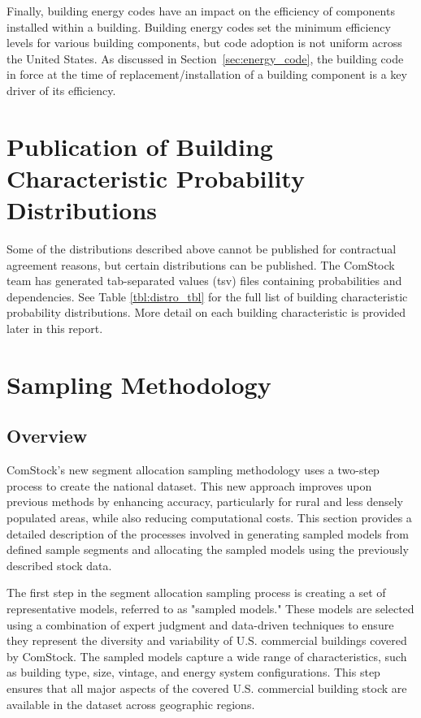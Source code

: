Finally, building energy codes have an impact on the efficiency of components installed within a building. Building energy codes set the minimum efficiency levels for various building components, but code adoption is not uniform across the United States. As discussed in Section~\ref{sec:energy_code}, the building code in force at the time of replacement/installation of a building component is a key driver of its efficiency.

\section{Publication of Building Characteristic Probability Distributions}
Some of the distributions described above cannot be published for contractual agreement reasons, but certain distributions can be published. The ComStock team has generated tab-separated values (tsv) files containing probabilities and dependencies. See Table \ref{tbl:distro_tbl} for the full list of building characteristic probability distributions. More detail on each building characteristic is provided later in this report.



\section{Sampling Methodology}\label{sec:sampling_method}
\subsection{Overview}
ComStock's new segment allocation sampling methodology uses a two-step process to create the national dataset. This new approach improves upon previous methods by enhancing accuracy, particularly for rural and less densely populated areas, while also reducing computational costs. This section provides a detailed description of the processes involved in generating sampled models from defined sample segments and allocating the sampled models using the previously described stock data.

The first step in the segment allocation sampling process is creating a set of representative models, referred to as "sampled models." These models are selected using a combination of expert judgment and data-driven techniques to ensure they represent the diversity and variability of U.S. commercial buildings covered by ComStock. The sampled models capture a wide range of characteristics, such as building type, size, vintage, and energy system configurations. This step ensures that all major aspects of the covered U.S. commercial building stock are available in the dataset across geographic regions.

